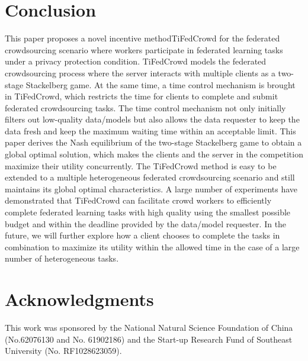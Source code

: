 \documentclass[final,1p,times]{elsarticle}
\begin{document}
\section{Conclusion} \label{sec:con}
This paper proposes a novel incentive methodTiFedCrowd for the federated crowdsourcing scenario where workers participate in federated learning tasks under a privacy protection condition. TiFedCrowd models the federated crowdsourcing process where the server interacts with multiple clients as a two-stage Stackelberg game. At the same time, a time control mechanism is brought in TiFedCrowd, which restricts the time for clients to complete and submit federated crowdsourcing tasks. The time control mechanism not only initially filters out low-quality data/models but also allows the data requester to keep the data fresh and keep the maximum waiting time within an acceptable limit. This paper derives the Nash equilibrium of the two-stage Stackelberg game to obtain a global optimal solution, which makes the clients and the server in the competition maximize their utility concurrently. The TiFedCrowd method is easy to be extended to a multiple heterogeneous federated crowdsourcing scenario and still maintains its global optimal characteristics. A large number of experiments have demonstrated that TiFedCrowd can facilitate crowd workers to efficiently complete federated learning tasks with high quality using the smallest possible budget and within the deadline provided by the data/model requester. In the future, we will further explore how a client chooses to complete the tasks in combination to maximize its utility within the allowed time in the case of a large number of heterogeneous tasks.

\section*{Acknowledgments}
This work was sponsored by the National Natural Science Foundation of China (No.62076130 and No. 61902186) and the Start-up Research Fund of Southeast University (No. RF1028623059).



\end{document}
